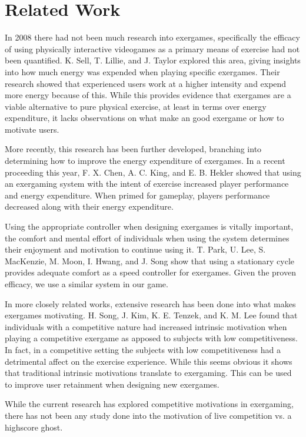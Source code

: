 \documentclass[a4paper, 11pt]{article}
\begin{document}
\clearpage

\section{Related Work}
\begin{multicols}{2}

In 2008 there had not been much research into exergames, specifically the efficacy of using physically interactive videogames as a primary means of exercise had not been quantified. K. Sell, T. Lillie, and J. Taylor \cite{sell2008energy} explored this area, giving insights into how much energy was expended when playing specific exergames. Their research showed that experienced users work at a higher intensity and expend more energy because of this. While this provides evidence that exergames are a viable alternative to pure physical exercise, at least in terms over energy expenditure, it lacks observations on what make an good exergame or how to motivate users.

More recently, this research has been further developed, branching into determining how to improve the energy expenditure of exergames. In a recent proceeding this year, F. X. Chen, A. C. King, and E. B. Hekler \cite{chen2014healthifying} showed that using an exergaming system with the intent of exercise increased player performance and energy expenditure. When primed for gameplay, players performance decreased along with their energy expenditure.

Using the appropriate controller when designing exergames is vitally important, the comfort and mental effort of individuals when using the system determines their enjoyment and motivation to continue using it. T. Park, U. Lee, S. MacKenzie, M. Moon, I. Hwang, and J. Song \cite{park2014human} show that using a stationary cycle provides adequate comfort as a speed controller for exergames. Given the proven efficacy, we use a similar system in our game.

In more closely related works, extensive research has been done into what makes exergames motivating. H. Song, J. Kim, K. E. Tenzek, and K. M. Lee \cite{song2010effects} found that individuals with a competitive nature had increased intrinsic motivation when playing a competitive exergame as apposed to subjects with low competitiveness. In fact, in a competitive setting the subjects with low competitiveness had a detrimental affect on the exercise experience. While this seems obvious it shows that traditional intrinsic motivations translate to exergaming. This can be used to improve user retainment when designing new exergames.

While the current research has explored competitive motivations in exergaming, there has not been any study done into the motivation of live competition vs. a highscore ghost.

\end{multicols}
\end{document}
